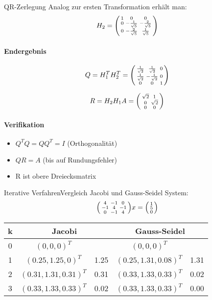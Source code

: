 \begin{example2}{QR-Zerlegung}
Analog zur ersten Transformation erhält man:
$$H_2 = \begin{psmallmatrix}
1 & 0 & 0\\
0 & -\frac{1}{\sqrt{5}} & -\frac{2}{\sqrt{5}}\\
0 & -\frac{2}{\sqrt{5}} & \frac{1}{\sqrt{5}}
\end{psmallmatrix}$$

\paragraph{Endergebnis}
$$Q = H_1^TH_2^T = \begin{psmallmatrix}
\frac{1}{\sqrt{2}} & \frac{1}{\sqrt{2}} & 0\\
\frac{1}{\sqrt{2}} & -\frac{1}{\sqrt{2}} & 0\\
0 & 0 & 1
\end{psmallmatrix}$$

$$R = H_2H_1A = \begin{psmallmatrix}
\sqrt{2} & 1\\
0 & \sqrt{2}\\
0 & 0
\end{psmallmatrix}$$

\paragraph{Verifikation}
\begin{itemize}
    \item $Q^TQ = QQ^T = I$ (Orthogonalität)
    \item $QR = A$ (bis auf Rundungsfehler)
    \item R ist obere Dreiecksmatrix
\end{itemize}
\end{example2}

\begin{example2}{Iterative Verfahren}{Vergleich Jacobi und Gauss-Seidel}
System:
$$\begin{psmallmatrix}
4 & -1 & 0\\
-1 & 4 & -1\\
0 & -1 & 4
\end{psmallmatrix}x = \begin{psmallmatrix}
1\\
5\\
0
\end{psmallmatrix}$$

\begin{center}
\begin{tabular}{c|cc|cc}
k & \multicolumn{2}{c|}{Jacobi} & \multicolumn{2}{c}{Gauss-Seidel}\\
\hline
0 & $(0,0,0)^T$ & & $(0,0,0)^T$ &\\
1 & $(0.25,1.25,0)^T$ & 1.25 & $(0.25,1.31,0.08)^T$ & 1.31\\
2 & $(0.31,1.31,0.31)^T$ & 0.31 & $(0.33,1.33,0.33)^T$ & 0.02\\
3 & $(0.33,1.33,0.33)^T$ & 0.02 & $(0.33,1.33,0.33)^T$ & 0.00
\end{tabular}
\end{center}
\end{example2}




